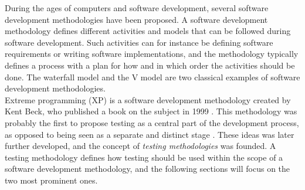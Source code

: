 
During the ages of computers and software development, several software
development methodologies have been proposed. A software development
methodology defines different activities and models that can be
followed during software development. Such activities can for instance
be defining software requirements or writing software implementations,
and the methodology typically defines a process with a plan for how and
in which order the activities should be done. The waterfall model and
the V model are two classical examples of software development
methodologies. \cite{article:sw_methodologies}\\

Extreme programming (XP) is a software development methodology created
by Kent Beck, who published a book on the subject in 1999
\cite{wiki:xp}. This methodology was probably the first to propose
testing as a central part of the development process, as opposed to
being seen as a separate and distinct stage
\cite{article:sw_methodologies}. These ideas was later further
developed, and the concept of \emph{testing methodologies} was founded.
A testing methodology defines how testing should be used within the
scope of a software development methodology, and the following sections
will focus on the two most prominent ones.\\
